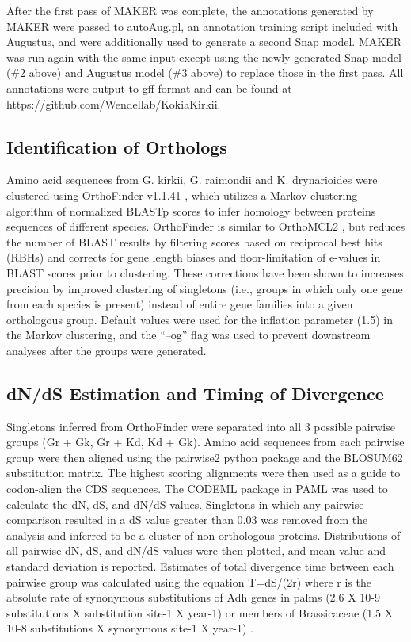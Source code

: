 \documentclass[10pt,letterpaper]{article}
\newcommand{\note}[2][]{\added[id=#1,remark={#2}]{}}
\begin{document}
After the first pass of MAKER was complete, the annotations generated by MAKER
were passed to autoAug.pl, an annotation training script included with Augustus,
and were additionally used to generate a second Snap model. MAKER was run again
with the same input except using the newly generated Snap model (\#2 above) and
Augustus model (\#3 above) to replace those in the first pass. All annotations
were output to gff format and can be found at
https://github.com/Wendellab/KokiaKirkii.

\subsection*{Identification of Orthologs}

Amino acid sequences from G. kirkii, G. raimondii and K. drynarioides were
clustered using OrthoFinder v1.1.41 \cite{Emms2015}, which utilizes a Markov
clustering algorithm of normalized BLASTp scores to infer homology between
proteins sequences of different species. OrthoFinder is similar to OrthoMCL2
\cite{Li2003}, but reduces the number of BLAST results by filtering scores based
on reciprocal best hits (RBHs) and corrects for gene length biases and
floor-limitation of e-values in BLAST scores prior to clustering. These
corrections have been shown to increases precision by improved clustering of
singletons (i.e., groups in which only one gene from each species is present)
instead of entire gene families into a given orthologous group. Default values
were used for the inflation parameter (1.5) in the Markov clustering, and the
“–og” flag was used to prevent downstream analyses after the groups were
generated.


\subsection*{dN/dS Estimation and Timing of Divergence}

Singletons inferred from OrthoFinder were separated into all 3 possible pairwise
groups (Gr + Gk, Gr + Kd, Kd + Gk). Amino acid sequences from each pairwise
group were then aligned using the pairwise2 python package and the BLOSUM62
substitution matrix. The highest scoring alignments were then used as a guide to
codon-align the CDS sequences. The CODEML package in PAML \cite{Yang2007} was
used to calculate the dN, dS, and dN/dS values. Singletons in which any pairwise
comparison resulted in a dS value greater than 0.03\note[Justin]{May need to
  adjust after doing said analysis}\note[Corrinne]{What was our justification
  for this again?} was removed from the analysis and inferred to be a cluster of
non-orthologous proteins. Distributions of all pairwise dN, dS, and dN/dS values
were then plotted, and mean value and standard deviation is reported. Estimates
of total divergence time between each pairwise group was calculated using the
equation T=dS/(2r) where r is the absolute rate of synonymous substitutions of
Adh genes in palms (2.6 X 10-9 substitutions X substitution site-1 X year-1)
\cite{Cronn2002, Morton1996} or members of Brassicaceae (1.5 X 10-8
substitutions X synonymous site-1 X year-1) \cite{Koch2000}.
\end{document}
